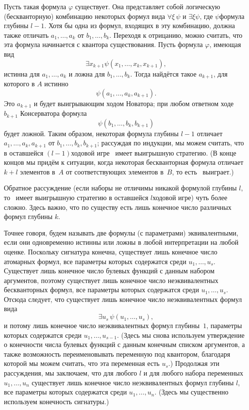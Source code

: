 Пусть такая формула $\varphi$ существует. Она представляет собой
логическую (бескванторную) комбинацию некоторых формул вида
$\forall \xi \,\psi$ и $\exists\xi \psi$, где $\psi$\т формула
глубины $l-1$. Хотя бы одна из формул, входящих в эту
комбинацию, должна также
отличать
$a_1,\dots,a_k$ от $b_1,\dots,b_k$.
Переходя к отрицанию, можно считать, что эта формула начинается
с квантора существования. Пусть формула $\varphi$, имеющая вид
        $$
\exists x_{k+1} \psi(x_1,\dots,x_k,x_{k+1}),
        $$
истинна для $a_1,\dots,a_k$ и ложна для $b_1,\dots,b_k$. Тогда
найдётся такое $a_{k+1}$, для которого в $A$ истинно
        $$
\psi(a_1,\dots,a_k,a_{k+1}).
        $$
Это $a_{k+1}$ и будет выигрывающим ходом Новатора; при любом
ответном ходе $b_{k+1}$ Консерватора формула
        $$
\psi(b_1,\dots,b_k,b_{k+1})
        $$
будет ложной. Таким образом, некоторая формула глубины $l-1$
отличает $a_1,\dots,a_k,a_{k+1}$ от $b_1,\dots,b_k,b_{k+1}$; 
рассуждая по индукции, мы можем считать, что в
оставшейся $(l-1)$\д ходовой игре \Н\ имеет выигрышную
стратегию. (В конце концов мы придём к ситуации, когда некоторая
бескванторная формула отличает $k+l$ элементов в~$A$ от
соответствующих элементов в~$B$, то есть \Н\ выиграет.)

Обратное рассуждение (если наборы не отличимы никакой формулой
глубины $l$, то \К\ имеет выигрышную стратегию в оставшейся
$l$\д ходовой игре) чуть более сложно. Здесь
важно, что по существу есть лишь конечное число различных формул
глубины $k$.

Точнее говоря, будем называть две формулы (с параметрами)
эквивалентными,
если они одновременно истинны или ложны в любой интерпретации на
любой оценке.
Поскольку сигнатура конечна, существует лишь
конечное число атомарных формул, все параметры которых
содержатся среди $u_1,\dots,u_s$. Существует лишь конечное число
булевых функций с данным набором аргументов, поэтому существует
лишь конечное число неэквивалентных бескванторных формул, все
параметры которых содержатся среди $u_1,\dots,u_s$. Отсюда
следует, что существует лишь конечное число неэквивалентных
формул вида
        $$
\exists u_s\, \psi(u_1,\dots,u_{s}),
        $$
и потому лишь конечное число неэквивалентных формул глубины~$1$,
параметры которых содержатся среди $u_1,\dots,u_{s-1}$. (Здесь
мы снова используем утверждение о конечности числа булевых
функций с данным конечным списком
аргументов, а также возможность
переименовывать переменную под квантором, благодаря которой мы
можем считать, что эта переменная есть $u_s$.) Продолжая эти
рассуждения, мы заключаем, что для любого $l$ и для любого
набора переменных $u_1,\dots,u_n$ существует лишь конечное число
неэквивалентных формул глубины $l$, все параметры которых
содержатся среди $u_1,\dots,u_n$. (Здесь мы существенно
используем конечность сигнатуры.)

